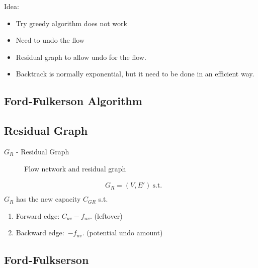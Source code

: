 \documentclass[a4paper]{report}
\theoremstyle{definition}
\begin{document}
Idea:
\begin{itemize}
\item Try greedy algorithm does not work
\item Need to undo the flow
\item Residual graph to allow undo for the flow.
\item Backtrack is normally exponential, but it need to be done in an efficient way.
\end{itemize}
\subsection{Ford-Fulkerson Algorithm}
\subsection{Residual Graph}
$G_R$ - Residual Graph
\begin{figure}[!htp]
\centering
{}
\caption{Flow network and residual graph}
\label{fig:7_4}
\end{figure}
\begin{align*}
&G_R = (V, E')~\text{s.t.}\\
\end{align*}
$G_R$ has the new capacity $C_{GR}$ s.t.
\begin{enumerate}
\item Forward edge: $C_{uv}-f_{uv}$. (leftover)
\item Backward edge:\ $-f_{uv}$. (potential undo amount)
\end{enumerate}
\subsection{Ford-Fulkserson}
\end{document}
